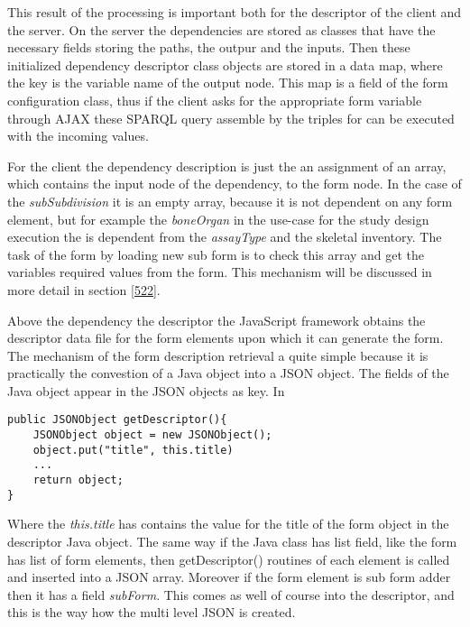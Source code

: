 
This result of the processing is important both for the descriptor of the client and the server. On the server the dependencies are stored as classes that have the necessary fields storing the paths, the outpur and the inputs. Then these initialized dependency descriptor class objects are stored in a data map, where the key is the variable name of the output node. This map is a field of the form configuration class, thus if the client asks for the appropriate form variable through AJAX these SPARQL query assemble by the triples for can be executed with the incoming values.

For the client the dependency description is just the an assignment of an array, which contains the input node of the dependency, to the form node. In the case of the \textit{subSubdivision} it is an empty array, because it is not dependent on any form element, but for example the \textit{boneOrgan} in the use-case for the study design execution the is dependent from the \textit{assayType} and the skeletal inventory. The task of the form by loading new sub form is to check this array and get the variables required values from the form. This mechanism will be discussed in more detail in section \ref{522}. 

Above the dependency the descriptor the JavaScript framework obtains the descriptor data file for the form elements upon which it can generate the form. The mechanism of the form description retrieval a quite simple because it is practically the convestion of a Java object into a JSON object. The fields of the Java object appear in the JSON objects as key. In 

\begin{lstlisting}[basicstyle=\footnotesize, frame=single, caption={Java to JSON}, captionpos=b, belowskip=1em, aboveskip=2em]
public JSONObject getDescriptor(){
	JSONObject object = new JSONObject();
	object.put("title", this.title)
	... 
	return object;	
}
\end{lstlisting}

Where the \textit{this.title} has contains the value for the title of the form object in the descriptor Java object. The same way if the Java class has list field, like the form has list of form elements, then getDescriptor() routines of each element is called and inserted into a JSON array. Moreover if the form element is sub form adder then it has a field \textit{subForm}. This comes as well of course into the descriptor, and this is the way how the multi level JSON is created.


